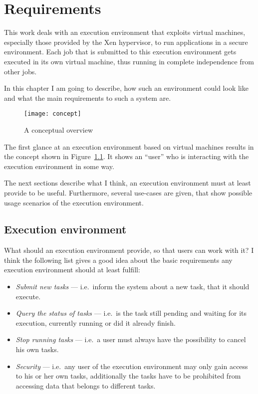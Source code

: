 \chapter{Requirements}
\label{cha:requirements}

This  work  deals with  an  execution  environment  that exploits  virtual
machines,  especially  those  provided  by  the  Xen  hypervisor,  to  run
applications in a  secure environment. Each job that  is submitted to this
execution  environment gets  executed  in its  own  virtual machine,  thus
running in complete independence from other jobs.

In this chapter I am going to describe, how such an environment could look
like and what the main requirements to such a system are.

\begin{figure}[htbp]
  \centering
  \texttt{[image: concept]}
  \caption[Conceptual overview]{A conceptual overview}
  \label{fig:concept}
\end{figure}

The first  glance at  an execution environment  based on  virtual machines
results  in the concept  shown in  Figure~\ref{fig:concept}.  It  shows an
``user'' who is interacting with the execution environment in some way.

\medskip

The next sections describe what  I think, an execution environment must at
least provide to be useful. Furthermore, several use-cases are given, that
show possible usage scenarios of the execution environment.

\section{Execution environment}
\label{sec:req-execution-environment}

What should an execution environment  provide, so that users can work with
it?   I  think the  following  list  gives a  good  idea  about the  basic
requirements any execution environment should at least fulfill:

\begin{itemize}
\item \emph{Submit new tasks} --- i.e.~inform the system about a new task,
  that it should execute.
\item \emph{Query the status of  tasks} --- i.e.~is the task still pending
  and  waiting for  its execution,  currently  running or  did it  already
  finish.
\item \emph{Stop running tasks} --- i.e.~a user must always have the
  possibility to cancel his own tasks.
\item \emph{Security}  --- i.e.~any user of the  execution environment may
  only gain access to his or her own tasks, additionally the tasks have to
  be prohibited from accessing data that belongs to different tasks.
\end{itemize}

